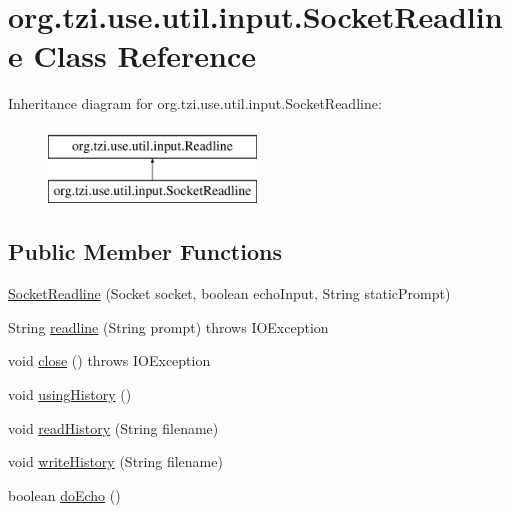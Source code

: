 \hypertarget{classorg_1_1tzi_1_1use_1_1util_1_1input_1_1_socket_readline}{\section{org.\-tzi.\-use.\-util.\-input.\-Socket\-Readline Class Reference}
\label{classorg_1_1tzi_1_1use_1_1util_1_1input_1_1_socket_readline}
}
Inheritance diagram for org.\-tzi.\-use.\-util.\-input.\-Socket\-Readline\-:\begin{figure}[H]
\begin{center}
\leavevmode
\includegraphics[height=2.000000cm]{classorg_1_1tzi_1_1use_1_1util_1_1input_1_1_socket_readline}
\end{center}
\end{figure}
\subsection*{Public Member Functions}
\begin{DoxyCompactItemize}
\item 
\hyperlink{classorg_1_1tzi_1_1use_1_1util_1_1input_1_1_socket_readline_acaf8b51694f1a6d790de3d7705f12863}{Socket\-Readline} (Socket socket, boolean echo\-Input, String static\-Prompt)
\item 
String \hyperlink{classorg_1_1tzi_1_1use_1_1util_1_1input_1_1_socket_readline_a5eaedd2e489b9b85822c91fb2f1e6394}{readline} (String prompt)  throws I\-O\-Exception 
\item 
void \hyperlink{classorg_1_1tzi_1_1use_1_1util_1_1input_1_1_socket_readline_aeeb824723a3ca0a2dccce473665af851}{close} ()  throws I\-O\-Exception 
\item 
void \hyperlink{classorg_1_1tzi_1_1use_1_1util_1_1input_1_1_socket_readline_acaf6fe17e0575f283558ca516193204a}{using\-History} ()
\item 
void \hyperlink{classorg_1_1tzi_1_1use_1_1util_1_1input_1_1_socket_readline_a2cd42937717dcc9be5f2607c8a4680e3}{read\-History} (String filename)
\item 
void \hyperlink{classorg_1_1tzi_1_1use_1_1util_1_1input_1_1_socket_readline_a2f83b2bdf3276d04efa5863aecd5fce3}{write\-History} (String filename)
\item 
boolean \hyperlink{classorg_1_1tzi_1_1use_1_1util_1_1input_1_1_socket_readline_a3c972426ba8591fef9f377e90e714bc4}{do\-Echo} ()
\end{DoxyCompactItemize}


